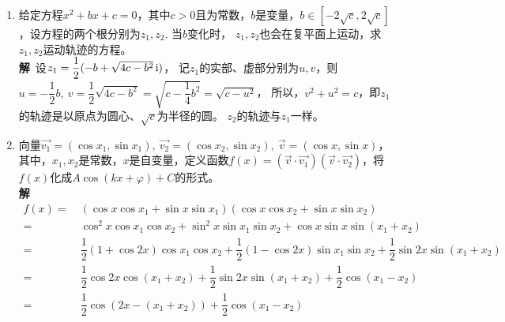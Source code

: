 \begin{enumerate}[label={【\textbf{例\thechapter.\arabic*}】},
 leftmargin=\inteval{\myenumleftmargin}pt,
 itemsep=\inteval{\myenumitempsep}pt,
 itemindent=\inteval{\myenumitemindent}pt]
\begin{align*}
    \begin{dcases}
        a^2+b^2=1 & \mycircled{1}\\ 
        c^2+d^2=1 & \mycircled{2}\\
        a+c=\dfrac{1}{2} &\mycircled{3}\\ 
        b+d=\dfrac{\sqrt{3}}{2} & \mycircled{4}
    \end{dcases}
\end{align*}
用$ - $可得：
\begin{align*}
    a^2-c^2 &=d^2-b^2 \\
    (a-c)\underbrace{(a+c)}_{\frac{1}{2}} &
    =(d-b)\underbrace{(d+b)}_{\frac{\sqrt{3}}{2}}   \\
    a-c&=\sqrt{3}(d-b)\q \mycircled{5}
\end{align*}
又由,可得：
\begin{align*}
    a+c=\dfrac{\sqrt{3}}{3}(d+b)\q \mycircled{6}
\end{align*} 
由,解得$ a=\dfrac{\sqrt{3}}{3}(2d-b) $，
代入可得：$ \dfrac{4}{3}(b^2-bd+d^2)=1 $. 另外，
$ (b+d)^2=b^2+2bd+d^2=\dfrac{3}{4} $，于是得到$ bd=0 $，
与联立可解得$ b=0,\ \dfrac{\sqrt{3}}{2} $.余下省略。

\item 给定方程$ x^2+bx+c=0 $，其中$ c>0 $且为常数，$ b $是变量，$ b\in [-2\sqrt{c},
2\sqrt{c}] $，设方程的两个根分别为$ z_1,z_2 $. 当$ b $变化时，
$ z_1,z_2 $也会在复平面上运动，求$ z_1,z_2 $运动轨迹的方程。\\
\textbf{解}\ 设$ z_1=\dfrac{1}{2}(-b+\sqrt{4c-b^2}\, \mathrm{i}) $，
记$ z_1 $的实部、虚部分别为$ u,v $，则$ u=-\dfrac{1}{2}b,\ 
v=\dfrac{1}{2}\sqrt{4c-b^2}=\sqrt{c-\dfrac{1}{4}b^2}=\sqrt{c-u^2} $，
所以，$ v^2+u^2=c $，即$ z_1 $的轨迹是以原点为圆心、$ \sqrt{c} $为半径的圆。
$ z_2 $的轨迹与$ z_1 $一样。

\item 向量$ \vec{v_1}=(\cos x_1,\sin x_1),\ \vec{v_2}=
(\cos x_2,\sin x_2),\ \vec{v}=(\cos x,\sin x) $，
其中，$  x_1, x_2 $是常数，$ x $是自变量，定义函数$ f(x)=
(\vec{v}\cdot \vec{v_1})(\vec{v}\cdot
\vec{v_2}) $，将$ f( x) $化成$ A\cos(k x+\varphi)+C $的形式。\\
\textbf{解}\ 
\begin{align*}
    f(x)=&\ (\cos x\cos x_1+\sin x\sin x_1)(\cos x\cos x_2+\sin x\sin x_2) \\
    =&\ \cos^2x\cos x_1\cos x_2+\sin^2x\sin x_1\sin x_2+\cos x\sin x\sin(x_1+x_2) \\
    =&\ \dfrac{1}{2}(1+\cos2x)\cos x_1\cos x_2+\dfrac{1}{2}(1-\cos2x)\sin x_1\sin x_2
    +\dfrac{1}{2}\sin2x\sin(x_1+x_2) \\
    =&\  \dfrac{1}{2}\cos2x\cos(x_1+x_2)+\dfrac{1}{2}\sin2x\sin(x_1+x_2)
    +\dfrac{1}{2}\cos(x_1-x_2) \\
    =&\  \dfrac{1}{2}\cos(2x-(x_1+x_2))+\dfrac{1}{2}\cos(x_1-x_2)
\end{align*}


\end{enumerate}
